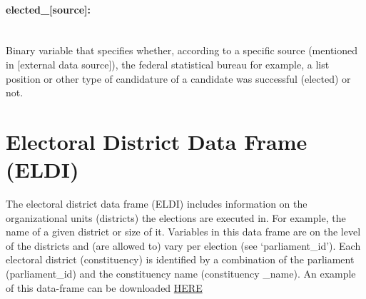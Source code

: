 \documentclass{article}
\begin{document}
\paragraph{elected\_[source]:}\\ Binary variable that specifies whether, according to a specific source (mentioned in [external data source]), the federal statistical bureau for example,  a list position or other type of candidature of a candidate was successful (elected) or not.
    
\section{Electoral District Data Frame (\gls{ELDI})}\label{ELDI}
The electoral district data frame (\gls{ELDI}) includes information on the organizational units (districts) the elections are executed in.  For example, the name of a given district or size of it. Variables in this data frame are on the level of the districts and (are allowed to) vary per election (see `parliament\_id'). Each electoral district (constituency) is identified by a combination of the parliament (parliament\_id) and the constituency name (constituency \_name). An example of this data-frame can be downloaded \href{http://parliamentarycareersincomparison.org/wp-content/uploads/2017/03/PCC-example-data_v311.xlsx}{HERE}
 
\end{document}

